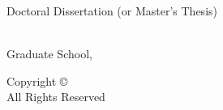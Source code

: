 \begin{titlepage}
    \thispagestyle{empty}
    \begin{center}			
        \vspace*{0cm}  %
        
        {\sffamily \large Doctoral Dissertation (or Master's Thesis)\par}
        
        \vspace*{1cm}
        
        {\LARGE\bfseries \thesistitle\par}
        
        \vspace{2cm}			
        
        {\large	\department\\ Graduate School, \university\par}
            
        \vspace{1cm}
            
        {\Large\bfseries \thesisauthor\par}
            
        \vfill
    
        {\large \submissiondate\par}
    
        \vspace{1cm}
    \end{center}		
\end{titlepage}


\newpage \cleardoublepage     %
\thispagestyle{empty}
\vspace*{\fill}
\begin{center}
    Copyright \copyright\ \the\year\ \thesisauthor\\
    All Rights Reserved
\end{center}
\vspace*{\fill}